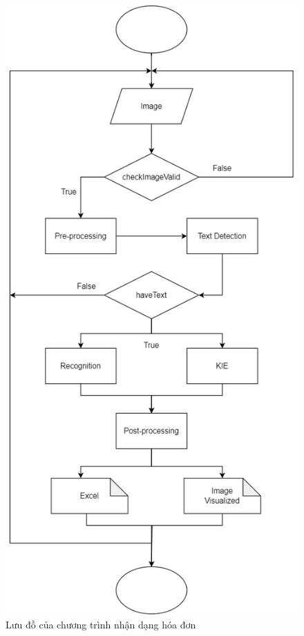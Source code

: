 \begin{figure}
    \includegraphics[scale=0.53]{images/pipeline.png}
    \centering
    \caption{Lưu đồ của chương trình nhận dạng hóa đơn}
    \label{pipeline}
\end{figure}

